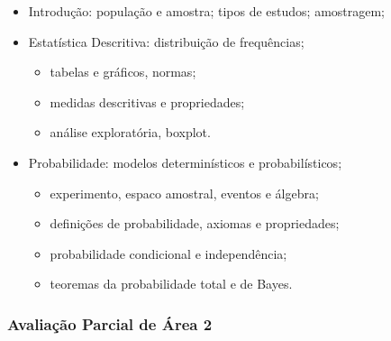 \documentclass[
]{article}
\providecommand{\tightlist}{%
  \setlength{\itemsep}{0pt}\setlength{\parskip}{0pt}}
\begin{document}
\begin{itemize}
\tightlist
\item
  Introdução: população e amostra; tipos de estudos; amostragem;
\item
  Estatística Descritiva: distribuição de frequências;

  \begin{itemize}
  \tightlist
  \item
    tabelas e gráficos, normas;
  \item
    medidas descritivas e propriedades;
  \item
    análise exploratória, boxplot.
  \end{itemize}
\item
  Probabilidade: modelos determinísticos e probabilísticos;

  \begin{itemize}
  \tightlist
  \item
    experimento, espaco amostral, eventos e álgebra;
  \item
    definições de probabilidade, axiomas e propriedades;
  \item
    probabilidade condicional e independência;
  \item
    teoremas da probabilidade total e de Bayes.
  \end{itemize}
\end{itemize}

\vspace{1.0cm}

\hypertarget{avaliauxe7uxe3o-parcial-de-uxe1rea-2}{%
\subsubsection{Avaliação Parcial de Área
2}\label{avaliauxe7uxe3o-parcial-de-uxe1rea-2}}
\end{document}
